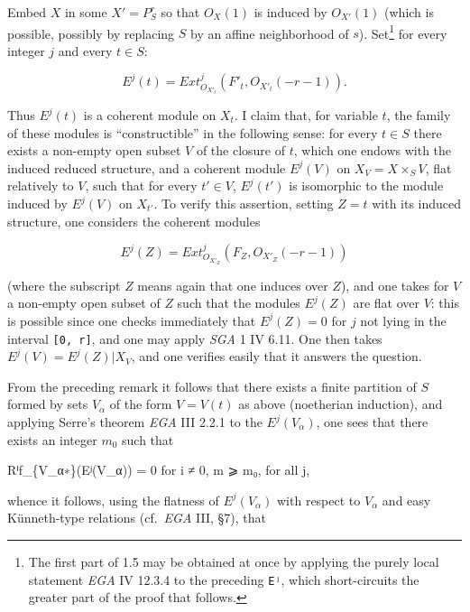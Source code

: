 \documentclass[
]{article}
\newenvironment{Shaded}{}{}
\newcommand{\NormalTok}[1]{#1}
\begin{document}
Embed \(X\) in some \(X' = P^{r}_{S}\) so that \(O_{X}(1)\) is induced
by \(O_{X'}(1)\) (which is possible, possibly by replacing \(S\) by an
affine neighborhood of \(s\)). Set\footnote{The first part of 1.5 may be
  obtained at once by applying the purely local statement \emph{EGA} IV
  12.3.4 to the preceding \texttt{Eʲ}, which short-circuits the greater
  part of the proof that follows.} for every integer \(j\) and every
\(t \in S\):

\[
E^{j}(t) = Ext^{j}_{O_{X'_{t}}}(F'_{t}, O_{X'_{t}}(-r - 1)).
\]

Thus \(E^{j}(t)\) is a coherent module on \(X_{t}\). I claim that, for
variable \(t\), the family of these modules is ``constructible'' in the
following sense: for every \(t \in S\) there exists a non-empty open
subset \(V\) of the closure of \(t\), which one endows with the induced
reduced structure, and a coherent module \(E^{j}(V)\) on
\(X_{V} = X \times_{S} V\), flat relatively to \(V\), such that for
every \(t' \in V\), \(E^{j}(t')\) is isomorphic to the module induced by
\(E^{j}(V)\) on \(X_{t'}\). To verify this assertion, setting
\(Z = {t}\) with its induced structure, one considers the coherent
modules

\[
E^{j}(Z) = Ext^{j}_{O_{X'_{Z}}}(F_{Z}, O_{X'_{Z}}(-r - 1))
\]

(where the subscript \(Z\) means again that one induces over \(Z\)), and
one takes for \(V\) a non-empty open subset of \(Z\) such that the
modules \(E^{j}(Z)\) are flat over \(V\): this is possible since one
checks immediately that \(E^{j}(Z) = 0\) for \(j\) not lying in the
interval \texttt{{[}0,\ r{]}}, and one may apply \emph{SGA} 1 IV 6.11.
One then takes \(E^{j}(V) = E^{j}(Z)|X_{V}\), and one verifies easily
that it answers the question.

From the preceding remark it follows that there exists a finite
partition of \(S\) formed by sets \(V_{\alpha}\) of the form
\(V = V(t)\) as above (noetherian induction), and applying Serre's
theorem \emph{EGA} III 2.2.1 to the \(E^{j}(V_{\alpha})\), one sees that
there exists an integer \(m_{0}\) such that

\begin{Shaded}
\begin{Highlighting}[]
\NormalTok{Rⁱf\_\{V\_α∗\}(Eʲ(V\_α)) = 0 for i ≠ 0, m ⩾ m₀, for all j,}
\end{Highlighting}
\end{Shaded}

whence it follows, using the flatness of \(E^{j}(V_{\alpha})\) with
respect to \(V_{\alpha}\) and easy Künneth-type relations
(cf.~\emph{EGA} III, §7), that
\end{document}
